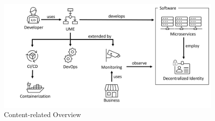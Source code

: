 \begin{figure}[h]
	\centering
	\includegraphics[width=\textwidth]{figures/content_overview.png}
	\caption{Content-related Overview}
	\label{fig:content_overview}
\end{figure}